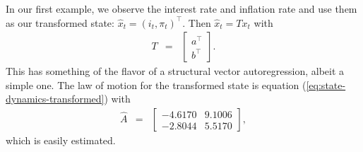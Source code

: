 \documentclass[11pt]{article}
\begin{document}
{In our first example, we observe the interest rate and inflation rate
and use them as our transformed state: $\hat{x}_t = (i_t,\pi_t)^\top$.
Then $\hat{x}_t = T x_t$ with
\begin{eqnarray*}
    T &=&
        \left[
        \begin{array}{c}
        a^\top \\ b^\top
        \end{array}
        \right] .
\end{eqnarray*}
This has something of the flavor of a structural vector autoregression,
albeit a simple one.
The law of motion for the transformed state is equation (\ref{eq:state-dynamics-transformed})
with
\begin{eqnarray*}
    \widehat{A} &=&
       \left[
        \begin{array}{rr}
         -4.6170 &   9.1006 \\  -2.8044  &  5.5170
        \end{array}
        \right] ,
\end{eqnarray*}
which is easily estimated.

}
\end{document}
